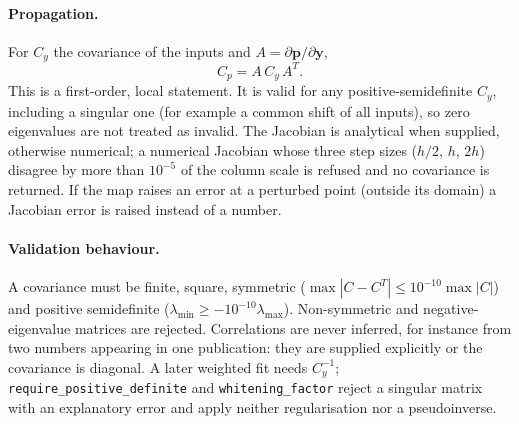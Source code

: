 \paragraph{Propagation.} For $C_y$ the covariance of the inputs and $A=\partial\mathbf p/\partial\mathbf y$,
\begin{equation}
C_p = A\,C_y\,A^{T}.
\end{equation}
This is a first-order, local statement. It is valid for any positive-semidefinite $C_y$, including a singular one (for example a common shift of all inputs), so zero eigenvalues are not treated as invalid. The Jacobian is analytical when supplied, otherwise numerical; a numerical Jacobian whose three step sizes ($h/2$, $h$, $2h$) disagree by more than $10^{-5}$ of the column scale is refused and no covariance is returned. If the map raises an error at a perturbed point (outside its domain) a Jacobian error is raised instead of a number.

\paragraph{Validation behaviour.} A covariance must be finite, square, symmetric ($\max|C-C^{T}|\le 10^{-10}\max|C|$) and positive semidefinite ($\lambda_{\min}\ge-10^{-10}\lambda_{\max}$). Non-symmetric and negative-eigenvalue matrices are rejected. Correlations are never inferred, for instance from two numbers appearing in one publication: they are supplied explicitly or the covariance is diagonal. A later weighted fit needs $C_y^{-1}$; \texttt{require\_positive\_definite} and \texttt{whitening\_factor} reject a singular matrix with an explanatory error and apply neither regularisation nor a pseudoinverse.

